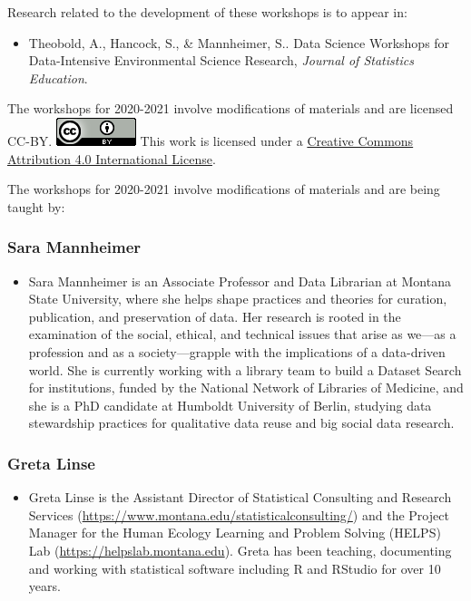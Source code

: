 \documentclass[
]{article}
\providecommand{\tightlist}{%
  \setlength{\itemsep}{0pt}\setlength{\parskip}{0pt}}
\begin{document}
Research related to the development of these workshops is to appear in:

\begin{itemize}
\tightlist
\item
  Theobold, A., Hancock, S., \& Mannheimer, S.. Data Science Workshops
  for Data-Intensive Environmental Science Research, \emph{Journal of
  Statistics Education}.
\end{itemize}

The workshops for 2020-2021 involve modifications of materials and are
licensed CC-BY. \includegraphics{images/88x31.png} This work is licensed
under a \href{http://creativecommons.org/licenses/by/4.0/}{Creative
Commons Attribution 4.0 International License}.

The workshops for 2020-2021 involve modifications of materials and are
being taught by:

\hypertarget{sara-mannheimer}{%
\subsubsection{Sara Mannheimer}\label{sara-mannheimer}}

\begin{itemize}
\tightlist
\item
  Sara Mannheimer is an Associate Professor and Data Librarian at
  Montana State University, where she helps shape practices and theories
  for curation, publication, and preservation of data. Her research is
  rooted in the examination of the social, ethical, and technical issues
  that arise as we---as a profession and as a society---grapple with the
  implications of a data-driven world. She is currently working with a
  library team to build a Dataset Search for institutions, funded by the
  National Network of Libraries of Medicine, and she is a PhD candidate
  at Humboldt University of Berlin, studying data stewardship practices
  for qualitative data reuse and big social data research.
\end{itemize}

\hypertarget{greta-linse}{%
\subsubsection{Greta Linse}\label{greta-linse}}

\begin{itemize}
\tightlist
\item
  Greta Linse is the Assistant Director of Statistical Consulting and
  Research Services
  (\url{https://www.montana.edu/statisticalconsulting/}) and the Project
  Manager for the Human Ecology Learning and Problem Solving (HELPS) Lab
  (\url{https://helpslab.montana.edu}). Greta has been teaching,
  documenting and working with statistical software including R and
  RStudio for over 10 years.
\end{itemize}
\end{document}

